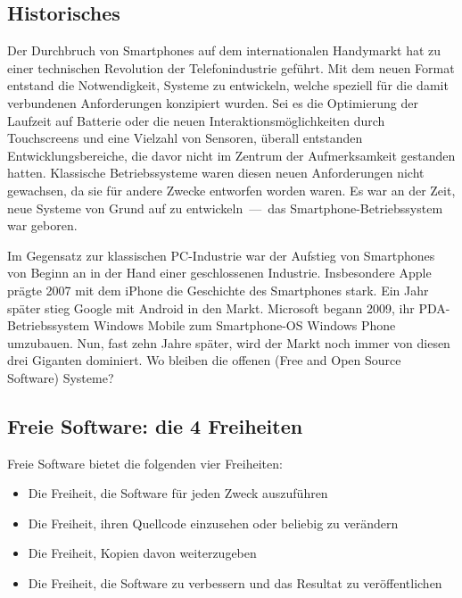 \subsection{Historisches}
Der Durchbruch von Smartphones auf dem internationalen Handymarkt hat zu einer technischen Revolution der Telefonindustrie geführt. Mit dem neuen Format entstand die Notwendigkeit, Systeme zu entwickeln, welche speziell für die damit verbundenen Anforderungen konzipiert wurden. Sei es die Optimierung der Laufzeit auf Batterie oder die neuen Interaktionsmöglichkeiten durch Touchscreens und eine Vielzahl von Sensoren, überall entstanden Entwicklungsbereiche, die davor nicht im Zentrum der Aufmerksamkeit gestanden hatten. Klassische Betriebssysteme waren diesen neuen Anforderungen nicht gewachsen, da sie für andere Zwecke entworfen worden waren. Es war an der Zeit, neue Systeme von Grund auf zu \mbox{entwickeln --- das} \mbox{Smartphone-Betriebssystem} war geboren.

Im Gegensatz zur klassischen \mbox{PC-Industrie} war der Aufstieg von Smartphones von Beginn an in der Hand einer geschlossenen Industrie. Insbesondere Apple prägte 2007 mit dem iPhone die Geschichte des Smartphones stark. Ein Jahr später stieg Google mit Android in den Markt. Microsoft begann 2009, ihr \mbox{PDA-Betriebssystem} Windows Mobile zum \mbox{Smartphone-OS} Windows Phone umzubauen. Nun, fast zehn Jahre später, wird der Markt noch immer von diesen drei Giganten dominiert. Wo bleiben die offenen (Free and Open Source Software) Systeme?
\newline

\subsection{Freie Software: die 4 Freiheiten}
Freie Software bietet die folgenden vier Freiheiten\thinspace\cite{online:fsf_vier-freiheiten}:
\begin{itemize}
	\renewcommand\labelitemi{--}
	\item Die Freiheit, die Software für jeden Zweck auszuführen
	\item  Die Freiheit, ihren Quellcode einzusehen oder beliebig zu verändern
	\item Die Freiheit, Kopien davon weiterzugeben
	\item Die Freiheit, die Software zu verbessern und das Resultat zu veröffentlichen
\end{itemize}
\mbox{}

